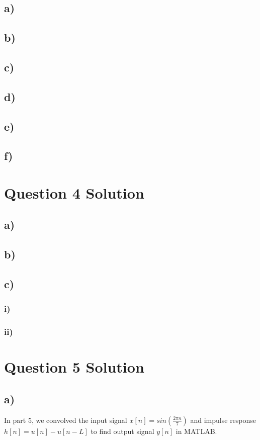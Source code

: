 \documentclass[letterpaper,12pt]{article}
\begin{document}
\subsection{a)}
\subsection{b)}
\subsection{c)}
\subsection{d)}
\subsection{e)}
\subsection{f)}

\section{Question 4 Solution}
\subsection{a)}
\subsection{b)}
\subsection{c)}

\subsubsection{i)}

\subsubsection{ii)}
\section{Question 5 Solution}
\subsection{a)}
In part 5, we convolved the input signal \(x[n] = sin(\frac{2\pi n}{7} )\) and impulse response \(h[n] = u[n] - u[n-L]\) to find output signal \(y[n]\) in MATLAB.
\end{document}
